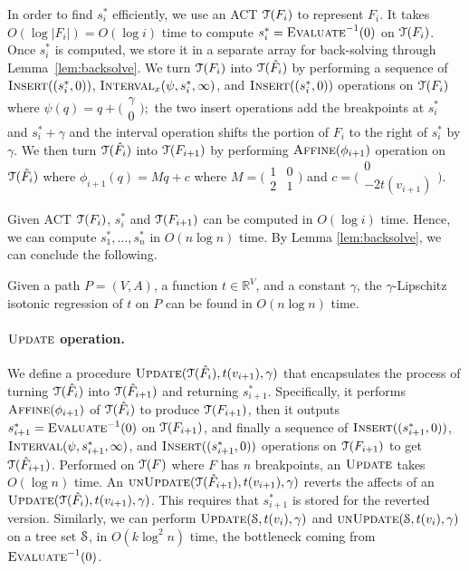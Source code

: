 \documentclass[11pt]{article}
\def\tvec{c}
\def\amat{M}
\def\TT{\EuScript{T}}
\def\evali{\mathop{\mbox{\textsc{Evaluate}}}^{-1}}
\def\ins{\mathop{\mbox{\textsc{Insert}}}}
\def\atrans{\mathop{\textsc{Affine}}}
\def\itrans{\mathop{\textsc{Interval}}}
\def\Update{\mathop{\textsc{Update}}}
\def\UnUpdate{\mathop{\textsc{unUpdate}}}
\newcommand{\hF}{\hat{F}}
\renewcommand{\c}[1]{\ensuremath{\EuScript{#1}}}
\begin{document}
In order to find $s^*_i$ efficiently, we use an ACT $\TT(F_i)$ to represent $F_i$.  It takes $O(\log |F_i|) = O(\log i)$ time to compute $s^*_i = \evali(0)$ on $\TT(F_i)$.  
Once $s^*_i$ is computed, we store it in a separate array for back-solving through Lemma~\ref{lem:backsolve}.  
We turn $\TT(F_i)$ into $\TT(\hF_{i})$ by performing a sequence of
$\ins((s_i^*,0))$, $\itrans_x(\psi, s_i^*, \infty)$, and $\ins((s_i^*,0))$ operations on $\TT(F_i)$ where 
$
\psi(q) = q + \bigl(\begin{smallmatrix} \gamma \\ 
		0\end{smallmatrix}\bigr);
$
the two insert operations add the breakpoints at $s_i^*$ and $s_i^*+\gamma$ and the interval operation shifts the portion of $F_i$ to the right of $s_i^*$ by $\gamma$.
We then turn $\TT(\hF_i)$ into $\TT(F_{i+1})$ by performing $\atrans(\phi_{i+1})$ operation on $\TT(\hF_i)$ where $\phi_{i+1}(q) = \amat q + \tvec$ where 
$\amat = \bigl(\begin{smallmatrix} 1 & 0 \\ 2 & 1\end{smallmatrix}\bigr)$ 
and 
$\tvec = \bigl(\begin{smallmatrix}0 \\ -2t(v_{i+1})\end{smallmatrix}\bigr)$.




Given ACT $\TT(F_i)$, $s_i^*$ and $\TT(F_{i+1})$ can be computed in $O(\log i)$ time.  Hence, we can compute $s_1^*, \ldots, s_n^*$ in $O(n \log n)$ time.  By Lemma \ref{lem:backsolve}, we can conclude the following.

\begin{theorem}
Given a path $P = (V, A)$, a function $t \in \mathbb{R}^V$, and a constant $\gamma$, the $\gamma$-Lipschitz isotonic regression of $t$ on $P$ can be found in $O(n \log n)$ time.
\end{theorem}



\paragraph{$\Update$ operation.}
We define a procedure $\Update(\TT(\hF_i), t(v_{i+1}), \gamma)$ that encapsulates the process of turning $\TT(\hF_i)$ into $\TT(\hF_{i+1})$ and returning $s_{i+1}^*$.  
Specifically, it performs $\atrans(\phi_{i+1})$ of $\TT(\hF_i)$ to produce $\TT(F_{i+1})$, then it outputs $s_{i+1}^* = \evali(0)$ on $\TT(F_{i+1})$, and finally a sequence of $\ins((s_{i+1}^*,0))$, $\itrans(\psi, s_{i+1}^*, \infty)$, 
and $\ins((s_{i+1}^*,0))$ operations on $\TT(F_{i+1})$ to 
get $\TT(\hF_{i+1})$.  
Performed on $\TT(F)$ where $F$ has $n$ breakpoints, an $\Update$ takes $O(\log n)$ time.  
An $\UnUpdate(\TT(\hF_{i+1}), t(v_{i+1}), \gamma)$ reverts the affects of an $\Update(\TT(\hF_i), t(v_{i+1}), \gamma)$.  This requires that $s_{i+1}^*$ is stored for the reverted version.  
Similarly, we can perform $\Update(\c{S}, t(v_i), \gamma)$ and $\UnUpdate(\c{S}, t(v_i), \gamma)$ on a tree set $\c{S}$, in $O(k \log^2 n)$ time, the bottleneck coming from $\evali(0)$.
\end{document}
